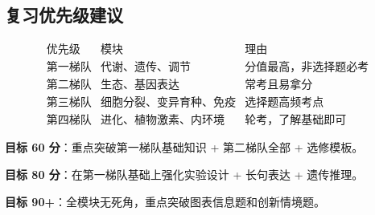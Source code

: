 \subsection{复习优先级建议}

\[
\begin{array}{c|c|c}
\text{优先级} & \text{模块} & \text{理由} \\ \hline
\textbf{第一梯队} & 代谢、遗传、调节 & 分值最高，非选择题必考 \\
\textbf{第二梯队} & 生态、基因表达 & 常考且易拿分 \\
\textbf{第三梯队} & 细胞分裂、变异育种、免疫 & 选择题高频考点 \\
\textbf{第四梯队} & 进化、植物激素、内环境 & 轮考，了解基础即可
\end{array}
\]

\textbf{目标 60 分}：重点突破第一梯队基础知识 + 第二梯队全部 + 选修模板。

\textbf{目标 80 分}：在第一梯队基础上强化实验设计 + 长句表达 + 遗传推理。

\textbf{目标 90+}：全模块无死角，重点突破图表信息题和创新情境题。

